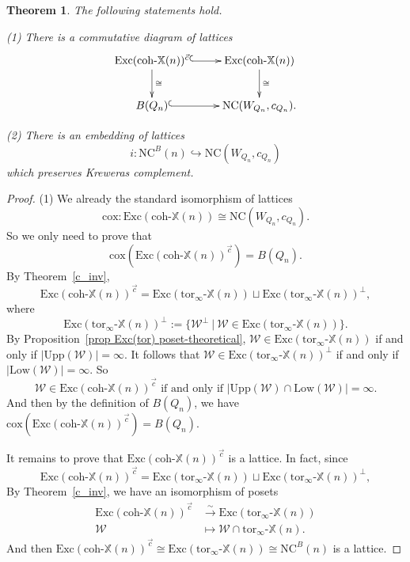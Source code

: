\documentclass[a4paper, 11pt, reqno]{amsart}
\numberwithin{equation}{section}
\newtheorem{thm}{Theorem}[section]
\theoremstyle{remark}
\theoremstyle{definition}
\begin{document}
\begin{thm} \label{thm B_n embedded in A_n tilde}
   The following statements hold.

   (1) There is a commutative diagram of lattices
   \[
   \xymatrix{\mathrm{Exc}(\mathrm{coh} \text{-} \mathbb X(n))^{\vec c} \ar@{^(->}[r] \ar[d]^{\cong} & \mathrm{Exc}(\mathrm{coh} \text{-} \mathbb X(n)) \ar[d]^{\cong} \\
   B(Q_n) \ar@{^(->}[r] & \mathrm{NC}(W_{Q_n},c_{Q_n}).
   }
   \]

   (2) There is an embedding of lattices 
   \[
     i: \mathrm{NC}^B(n) \hookrightarrow \mathrm{NC}(W_{Q_n},c_{Q_n})
   \] 
   which preserves Kreweras complement.
\end{thm}

\begin{proof}
   (1) We already the standard isomorphism of lattices
   \[\mathrm{cox}: \mathrm{Exc}(\mathrm{coh} \text{-} \mathbb X(n)) \cong \mathrm{NC}(W_{Q_n},c_{Q_n}). \]
   So we only need to prove that 
   \[ \mathrm{cox} (\mathrm{Exc}(\mathrm{coh} \text{-} \mathbb X(n))^{\vec c}) =B(Q_n). \]
   By Theorem~\ref{c_inv}, 
   \[\mathrm{Exc}(\mathrm{coh} \text{-} \mathbb X(n))^{\vec c}=\mathrm{Exc}(\mathrm{tor}_{\infty} \text{-} \mathbb X(n)) \sqcup \mathrm{Exc}(\mathrm{tor}_{\infty} \text{-} \mathbb X(n))^{\perp},\] 
   where 
   \[\mathrm{Exc}(\mathrm{tor}_{\infty} \text{-} \mathbb X(n))^{\perp}:=\{\mathcal W^{\perp} \ | \ \mathcal W \in \mathrm{Exc}(\mathrm{tor}_{\infty} \text{-} \mathbb X(n)) \}.\]
   By Proposition~\ref{prop Exc(tor) poset-theoretical}, $\mathcal W \in \mathrm{Exc}(\mathrm{tor}_{\infty} \text{-} \mathbb X(n))$ if and only if $|\mathrm{Upp}(\mathcal W)|=\infty$. It follows that $\mathcal W \in \mathrm{Exc}(\mathrm{tor}_{\infty} \text{-} \mathbb X(n))^{\perp}$ if and only if $|\mathrm{Low}(\mathcal W)|=\infty$. So 
   \[\mathcal W \in \mathrm{Exc}(\mathrm{coh} \text{-} \mathbb X(n))^{\vec c} \text{ if and only if } |\mathrm{Upp}(\mathcal W) \cap \mathrm{Low}(\mathcal W)|=\infty.\]
   And then by the definition of $B(Q_n)$, we have $\mathrm{cox} (\mathrm{Exc}(\mathrm{coh} \text{-} \mathbb X(n))^{\vec c}) =B(Q_n)$.

   It remains to prove that $\mathrm{Exc}(\mathrm{coh} \text{-} \mathbb X(n))^{\vec c}$ is a lattice. In fact, since 
   \[\mathrm{Exc}(\mathrm{coh} \text{-} \mathbb X(n))^{\vec c}=\mathrm{Exc}(\mathrm{tor}_{\infty} \text{-} \mathbb X(n)) \sqcup \mathrm{Exc}(\mathrm{tor}_{\infty} \text{-} \mathbb X(n))^{\perp},\]
   By Theorem~\ref{c_inv}, we have an isomorphism of posets
   \begin{align*}
      \mathrm{Exc}(\mathrm{coh} \text{-} \mathbb X(n))^{\vec c} &\xrightarrow{\sim} \mathrm{Exc}(\mathrm{tor}_{\infty} \text{-} \mathbb X(n)) \\
      \mathcal W &\mapsto \mathcal W \cap \mathrm{tor}_{\infty} \text{-} \mathbb X(n).
   \end{align*}
   And then $\mathrm{Exc}(\mathrm{coh} \text{-} \mathbb X(n))^{\vec c} \cong \mathrm{Exc}(\mathrm{tor}_{\infty} \text{-} \mathbb X(n)) \cong \mathrm{NC}^B(n)$ is a lattice.


\end{proof}
\end{document}
